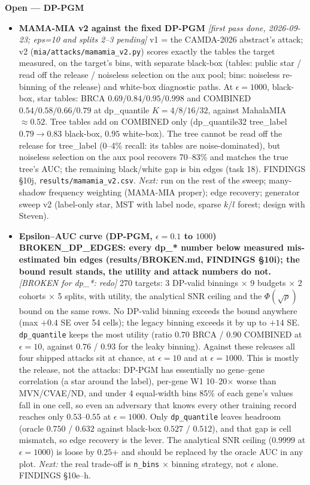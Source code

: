 \noindent\textbf{Open --- DP-PGM}
\begin{itemize}
\item \textbf{MAMA-MIA v2 against the fixed DP-PGM} \emph{[first pass done, 2026-09-23; eps=10 and splits 2--3 pending]} v1 = the CAMDA-2026 abstract's attack; v2 (\texttt{mia/attacks/mamamia\_v2.py}) scores exactly the tables the target measured, on the target's bins, with separate black-box (tables: public star / read off the release / noiseless selection on the aux pool; bins: noiseless re-binning of the release) and white-box diagnostic paths. At $\epsilon=1000$, black-box, star tables: BRCA $0.69/0.84/0.95/0.998$ and COMBINED $0.54/0.58/0.66/0.79$ at dp\_quantile $K=4/8/16/32$, against MahalaMIA $\approx0.52$. Tree tables add on COMBINED only (dp\_quantile32 tree\_label $0.79\to0.83$ black-box, $0.95$ white-box). The tree cannot be read off the release for tree\_label (0--4\% recall: its tables are noise-dominated), but noiseless selection on the aux pool recovers 70--83\% and matches the true tree's AUC; the remaining black/white gap is bin edges (task 18). FINDINGS \S10j, \texttt{results/mamamia\_v2.csv}. \emph{Next:} run on the rest of the sweep; many-shadow frequency weighting (MAMA-MIA proper); edge recovery; generator sweep v2 (label-only star, MST with label node, sparse $k$/$l$ forest; design with Steven).
\item \textbf{Epsilon--AUC curve (DP-PGM, $\epsilon = 0.1$ to $1000$)} \textbf{BROKEN\_DP\_EDGES: every dp\_* number below measured mis-estimated bin edges (results/BROKEN.md, FINDINGS \S10i); the bound result stands, the utility and attack numbers do not.} \emph{[BROKEN for dp\_*: redo]} 270 targets: 3 DP-valid binnings $\times$ 9 budgets $\times$ 2 cohorts $\times$ 5 splits, with utility, the analytical SNR ceiling and the $\Phi(\sqrt{\rho})$ bound on the same rows. No DP-valid binning exceeds the bound anywhere (max $+0.4$ SE over 54 cells); the legacy binning exceeds it by up to $+14$ SE. \texttt{dp\_quantile} keeps the most utility (ratio $0.70$ BRCA / $0.90$ COMBINED at $\epsilon=10$, against $0.76$ / $0.93$ for the leaky binning). Against these releases all four shipped attacks sit at chance, at $\epsilon=10$ and at $\epsilon=1000$. This is mostly the release, not the attacks: DP-PGM has essentially no gene--gene correlation (a star around the label), per-gene W1 10--20$\times$ worse than MVN/CVAE/ND, and under 4 equal-width bins 85\% of each gene's values fall in one cell, so even an adversary that knows every other training record reaches only $0.53$--$0.55$ at $\epsilon=1000$. Only \texttt{dp\_quantile} leaves headroom (oracle $0.750$ / $0.632$ against black-box $0.527$ / $0.512$), and that gap is cell mismatch, so edge recovery is the lever. The analytical SNR ceiling ($0.9999$ at $\epsilon=1000$) is loose by $0.25$+ and should be replaced by the oracle AUC in any plot. \emph{Next:} the real trade-off is \texttt{n\_bins} $\times$ binning strategy, not $\epsilon$ alone. FINDINGS \S10e--h.

\end{itemize}
